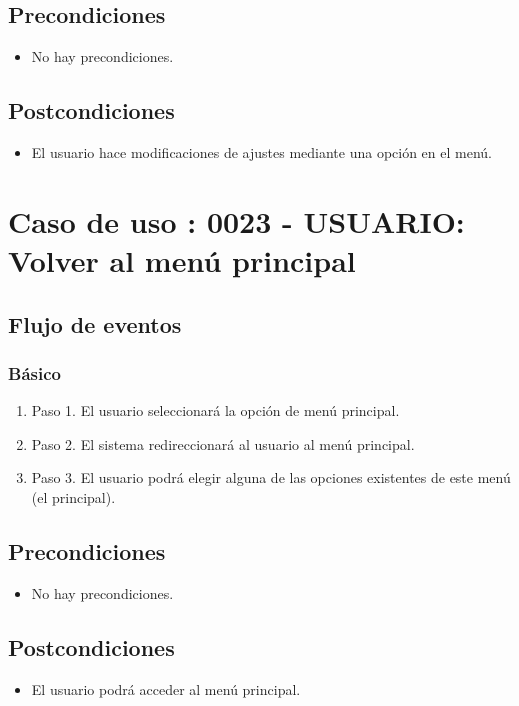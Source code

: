 \subsection{Precondiciones}
\begin{itemize}
\item No hay precondiciones.
\end{itemize}

\subsection{Postcondiciones}
\begin{itemize}
\item El usuario hace modificaciones de ajustes mediante una opción en el menú.
\end{itemize}



\section{Caso de uso : 0023 - USUARIO: Volver al menú principal}\label{sec:uc0}
\subsection{Flujo de eventos}
\subsubsection{Básico}

\begin{enumerate}
\item Paso 1.
El usuario seleccionará la opción de menú principal. 
\item Paso 2.
El sistema redireccionará al usuario al menú principal. 
\item Paso 3.
El usuario podrá elegir alguna de las opciones existentes de este menú (el principal).
\end{enumerate}

\subsection{Precondiciones}
\begin{itemize}
\item No hay precondiciones.
\end{itemize}

\subsection{Postcondiciones}
\begin{itemize}
\item El usuario podrá acceder al menú principal.
\end{itemize}



